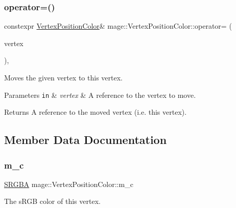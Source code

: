 \subsubsection{\texorpdfstring{operator=()}{operator=()}\hspace{0.1cm}{\footnotesize\ttfamily [2/2]}}
{\footnotesize\ttfamily constexpr \hyperlink{structmage_1_1_vertex_position_color}{Vertex\+Position\+Color}\& mage\+::\+Vertex\+Position\+Color\+::operator= (\begin{DoxyParamCaption}\item[{\hyperlink{structmage_1_1_vertex_position_color}{Vertex\+Position\+Color} \&\&}]{vertex }\end{DoxyParamCaption})\hspace{0.3cm}{\ttfamily [default]}, {\ttfamily [noexcept]}}

Moves the given vertex to this vertex.


\begin{DoxyParams}[1]{Parameters}
\mbox{\tt in}  & {\em vertex} & A reference to the vertex to move. \\
\hline
\end{DoxyParams}
\begin{DoxyReturn}{Returns}
A reference to the moved vertex (i.\+e. this vertex). 
\end{DoxyReturn}


\subsection{Member Data Documentation}
\hypertarget{structmage_1_1_vertex_position_color_ace34e71c422b7cbff4c6b94ce61d852c}{}\label{structmage_1_1_vertex_position_color_ace34e71c422b7cbff4c6b94ce61d852c} 
\subsubsection{\texorpdfstring{m\+\_\+c}{m\_c}}
{\footnotesize\ttfamily \hyperlink{structmage_1_1_s_r_g_b_a}{S\+R\+G\+BA} mage\+::\+Vertex\+Position\+Color\+::m\+\_\+c}

The s\+R\+GB color of this vertex. \hypertarget{structmage_1_1_vertex_position_color_a6438f99adc02bb094daa65c65d29133e}{}\label{structmage_1_1_vertex_position_color_a6438f99adc02bb094daa65c65d29133e} 
